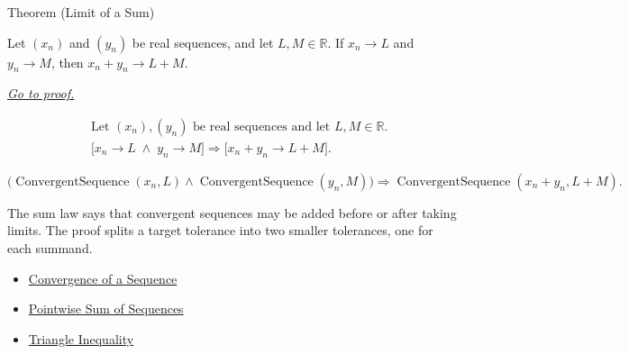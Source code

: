 
\begin{theorembox}{Theorem (Limit of a Sum)}
\begin{theorem}
\label{thm:limit-of-a-sum}
Let $(x_n)$ and $(y_n)$ be real sequences, and let $L,M\in\mathbb{R}$.
If $x_n\to L$ and $y_n\to M$, then $x_n+y_n\to L+M$.

\smallskip
\noindent
\hyperref[prf:limit-of-a-sum]{\textit{Go to proof.}}
\end{theorem}
\end{theorembox}

\begin{remark*}
\[
\begin{aligned}
&\text{Let } (x_n),(y_n) \text{ be real sequences and let } L,M\in\mathbb{R}.\\
&\bigl[
x_n\to L \;\land\; y_n\to M
\bigr]
\Longrightarrow
\bigl[
x_n+y_n\to L+M
\bigr].
\end{aligned}
\]
\end{remark*}

\begin{remark*}
\[
\bigl(
\operatorname{ConvergentSequence}(x_n,L)
\land
\operatorname{ConvergentSequence}(y_n,M)
\bigr)
\Longrightarrow
\operatorname{ConvergentSequence}(x_n+y_n,L+M).
\]
\end{remark*}

\begin{remark*}[Interpretation]
The sum law says that convergent sequences may be added before or after
taking limits. The proof splits a target tolerance into two smaller tolerances,
one for each summand.
\end{remark*}

\begin{dependencies}
\begin{itemize}
  \item \hyperref[def:convergent-sequence]{Convergence of a Sequence}
  \item \hyperref[def:pointwise-sum-sequence]{Pointwise Sum of Sequences}
  \item \hyperref[thm:triangle-inequality]{Triangle Inequality}
\end{itemize}
\end{dependencies}


